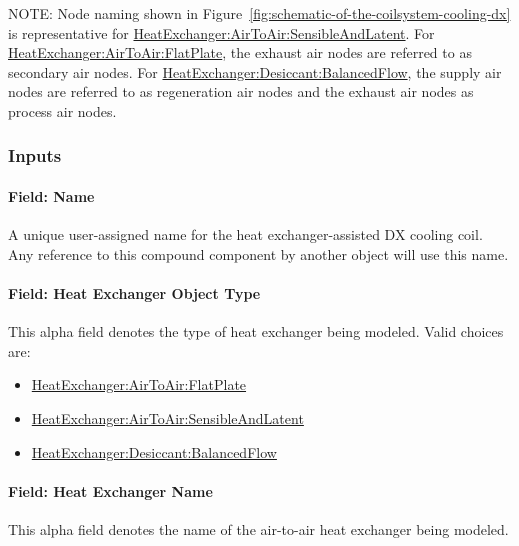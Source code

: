 NOTE: Node naming shown in Figure~\ref{fig:schematic-of-the-coilsystem-cooling-dx} is representative for \hyperref[heatexchangerairtoairsensibleandlatent]{HeatExchanger:AirToAir:SensibleAndLatent}. For \hyperref[heatexchangerairtoairflatplate]{HeatExchanger:AirToAir:FlatPlate}, the exhaust air nodes are referred to as secondary air nodes. For \hyperref[heatexchangerdesiccantbalancedflow]{HeatExchanger:Desiccant:BalancedFlow}, the supply air nodes are referred to as regeneration air nodes and the exhaust air nodes as process air nodes.

\subsubsection{Inputs}\label{inputs-25}

\paragraph{Field: Name}\label{field-name-24-000}

A unique user-assigned name for the heat exchanger-assisted DX cooling coil. Any reference to this compound component by another object will use this name.

\paragraph{Field: Heat Exchanger Object Type}\label{field-heat-exchanger-object-type-000}

This alpha field denotes the type of heat exchanger being modeled. Valid choices are:

\begin{itemize}
\item
  \hyperref[heatexchangerairtoairflatplate]{HeatExchanger:AirToAir:FlatPlate}
\item
  \hyperref[heatexchangerairtoairsensibleandlatent]{HeatExchanger:AirToAir:SensibleAndLatent}
\item
  \hyperref[heatexchangerdesiccantbalancedflow]{HeatExchanger:Desiccant:BalancedFlow}
\end{itemize}

\paragraph{Field: Heat Exchanger Name}\label{field-heat-exchanger-name-001}

This alpha field denotes the name of the air-to-air heat exchanger being modeled.


